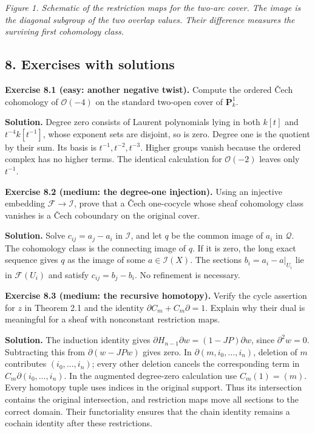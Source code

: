 \documentclass[11pt]{article}
\begin{document}
\emph{Figure 1. Schematic of the restriction maps for the two-arc cover.
The image is the diagonal subgroup of the two overlap values. Their
difference measures the surviving first cohomology class.}

\subsection{8. Exercises with solutions}\label{exercises-with-solutions}

\textbf{Exercise 8.1 (easy: another negative twist).} Compute the
ordered Čech cohomology of \(\mathcal O(-4)\) on the standard two-open
cover of \(\mathbf P^1_k\).

\textbf{Solution.} Degree zero consists of Laurent polynomials lying in
both \(k[t]\) and \(t^{-4}k[t^{-1}]\), whose exponent sets are disjoint,
so is zero. Degree one is the quotient by their sum. Its basis is
\(t^{-1},t^{-2},t^{-3}\). Higher groups vanish because the ordered
complex has no higher terms. The identical calculation for
\(\mathcal O(-2)\) leaves only \(t^{-1}\).

\textbf{Exercise 8.2 (medium: the degree-one injection).} Using an
injective embedding \(\mathcal F\to\mathcal I\), prove that a Čech
one-cocycle whose sheaf cohomology class vanishes is a Čech coboundary
on the original cover.

\textbf{Solution.} Solve \(c_{ij}=a_j-a_i\) in \(\mathcal I\), and let
\(q\) be the common image of \(a_i\) in \(\mathcal Q\). The cohomology
class is the connecting image of \(q\). If it is zero, the long exact
sequence gives \(q\) as the image of some \(a\in\mathcal I(X)\). The
sections \(b_i=a_i-a|_{U_i}\) lie in \(\mathcal F(U_i)\) and satisfy
\(c_{ij}=b_j-b_i\). No refinement is necessary.

\textbf{Exercise 8.3 (medium: the recursive homotopy).} Verify the cycle
assertion for \(z\) in Theorem 2.1 and the identity
\(\partial C_m+C_m\partial=1\). Explain why their dual is meaningful for
a sheaf with nonconstant restriction maps.

\textbf{Solution.} The induction identity gives
\(\partial H_{n-1}\partial w=(1-JP)\partial w\), since
\(\partial^2w=0\). Subtracting this from \(\partial(w-JPw)\) gives zero.
In \(\partial(m,i_0,\ldots,i_n)\), deletion of \(m\) contributes
\((i_0,\ldots,i_n)\); every other deletion cancels the corresponding
term in \(C_m\partial(i_0,\ldots,i_n)\). In the augmented degree-zero
calculation use \(C_m(1)=(m)\). Every homotopy tuple uses indices in the
original support. Thus its intersection contains the original
intersection, and restriction maps move all sections to the correct
domain. Their functoriality ensures that the chain identity remains a
cochain identity after these restrictions.
\end{document}
